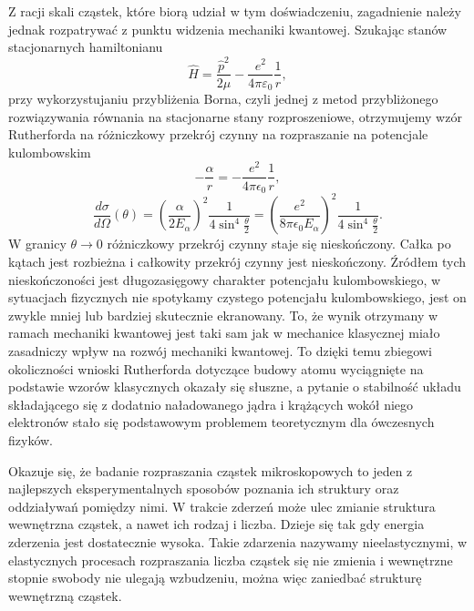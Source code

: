 \documentclass[11pt]{book}
\theoremstyle{definition}
\begin{document}
Z racji skali cząstek, które biorą udział w tym doświadczeniu, zagadnienie należy jednak rozpatrywać z punktu widzenia mechaniki kwantowej. Szukając stanów stacjonarnych hamiltonianu
%
\begin{equation}
\hat{H} = \frac{\hat{p}^2}{2\mu} - \frac{e^2}{4\pi\varepsilon_0} \frac{1}{r},
\end{equation}
%
przy wykorzystujaniu przybliżenia Borna, czyli jednej z metod przybliżonego rozwiązywania równania na stacjonarne stany rozproszeniowe, otrzymujemy wzór Rutherforda  \cite{Jaskolski..MQ}  na różniczkowy przekrój czynny na rozpraszanie na potencjale kulombowskim 
\begin{equation}
-\frac{\alpha}{r} = -\frac{e^2}{4\pi \epsilon_0}\frac{1}{r},
\end{equation}
%
\begin{equation}
\frac{d\sigma}{d\Omega}\left(\theta\right) = \left(\frac{\alpha}{2 E_{\alpha}} \right)^2 \frac{1}{4\sin^4 \frac{\theta}{2}} = \left(\frac{e^2}{8 \pi \epsilon_0  E_{\alpha}} \right)^2 \frac{1}{4\sin^4 \frac{\theta}{2}}. \label{eq:ruth}
\end{equation}
%
W granicy $\theta \rightarrow 0$ różniczkowy przekrój czynny staje się nieskończony. Całka po kątach jest rozbieżna i całkowity przekrój czynny jest nieskończony. Źródłem tych nieskończoności jest długozasięgowy charakter potencjału kulombowskiego, w sytuacjach fizycznych nie spotykamy czystego potencjału kulombowskiego, jest on zwykle mniej lub bardziej skutecznie ekranowany.
%
To, że wynik otrzymany w ramach mechaniki kwantowej jest taki sam jak w mechanice klasycznej miało zasadniczy wpływ na rozwój mechaniki kwantowej. To dzięki temu zbiegowi okoliczności wnioski Rutherforda dotyczące budowy atomu wyciągnięte na podstawie wzorów klasycznych okazały się słuszne, a pytanie o stabilność układu składającego się z dodatnio naładowanego jądra i krążących wokół niego elektronów stało się podstawowym problemem teoretycznym dla ówczesnych fizyków.
%

Okazuje się, że badanie rozpraszania cząstek mikroskopowych to jeden z najlepszych eksperymentalnych sposobów poznania ich struktury oraz oddziaływań pomiędzy nimi. W trakcie zderzeń może ulec zmianie struktura wewnętrzna cząstek, a nawet ich rodzaj i liczba. Dzieje się tak gdy energia zderzenia jest dostatecznie wysoka. Takie zdarzenia nazywamy nieelastycznymi, w elastycznych procesach rozpraszania liczba cząstek się nie zmienia i wewnętrzne stopnie swobody nie ulegają wzbudzeniu, można więc zaniedbać strukturę wewnętrzną cząstek. 
\end{document}
